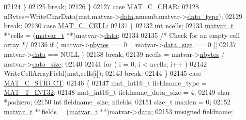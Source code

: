 \begin{DoxyCode}
{{{{{{{{{{{{{{{{02124             \}
02125             \textcolor{keywordflow}{break};
02126         \}
02127         \textcolor{keywordflow}{case} \hyperlink{group___m_a_t_ggad4d60ae7b709fc81bfd744fb4c857c40aacdec5834df0861130b393697646119c}{MAT\_C\_CHAR}:
02128             nBytes=WriteCharData(mat,matvar->\hyperlink{group___m_a_t_a5672978efa230bbdecdf38ede781f7fa}{data},nmemb,matvar->\hyperlink{group___m_a_t_ab6aafe9bd77f0f077852593dec438144}{data\_type});
02129             \textcolor{keywordflow}{break};
02130         \textcolor{keywordflow}{case} \hyperlink{group___m_a_t_ggad4d60ae7b709fc81bfd744fb4c857c40a2f7abb47a1c51e248bd4e5e03cc81b08}{MAT\_C\_CELL}:
02131         \{
02132             \textcolor{keywordtype}{int}        ncells;
02133             \hyperlink{group___m_a_t_structmatvar__t}{matvar\_t} **cells = (\hyperlink{group___m_a_t_structmatvar__t}{matvar\_t} **)matvar->\hyperlink{group___m_a_t_a5672978efa230bbdecdf38ede781f7fa}{data};
02134 
02135             \textcolor{comment}{/* Check for an empty cell array */}
02136             if ( matvar->\hyperlink{group___m_a_t_abf1c844540503be2df9bb3db93cfe307}{nbytes} == 0 || matvar->\hyperlink{group___m_a_t_a9ad1c82e2b568da617e12dc73a26e1f9}{data\_size} == 0 ||
02137                  matvar->\hyperlink{group___m_a_t_a5672978efa230bbdecdf38ede781f7fa}{data}   == NULL )
02138                 \textcolor{keywordflow}{break};
02139             ncells  = matvar->\hyperlink{group___m_a_t_abf1c844540503be2df9bb3db93cfe307}{nbytes} / matvar->\hyperlink{group___m_a_t_a9ad1c82e2b568da617e12dc73a26e1f9}{data\_size};
02140 
02141             \textcolor{keywordflow}{for} ( i = 0; i < ncells; i++ )
02142                 WriteCellArrayField(mat,cells[i]);
02143             \textcolor{keywordflow}{break};
02144         \}
02145         \textcolor{keywordflow}{case} \hyperlink{group___m_a_t_ggad4d60ae7b709fc81bfd744fb4c857c40acb467c7749c80902b798134c729bb521}{MAT\_C\_STRUCT}:
02146         \{
02147             mat\_int16\_t fieldname\_type = \hyperlink{group___m_a_t_ggacf7b3b879282b7ab3a51190e49bf3453a83e06a68320726c6572bfbb9f3addb1d}{MAT\_T\_INT32};
02148             mat\_int16\_t fieldname\_data\_size = 4;
02149             \textcolor{keywordtype}{char} *padzero;
02150             \textcolor{keywordtype}{int} fieldname\_size, nfields;
02151             \textcolor{keywordtype}{size\_t} maxlen = 0;
02152             \hyperlink{group___m_a_t_structmatvar__t}{matvar\_t} **fields = (\hyperlink{group___m_a_t_structmatvar__t}{matvar\_t} **)matvar->\hyperlink{group___m_a_t_a5672978efa230bbdecdf38ede781f7fa}{data};
02153             \textcolor{keywordtype}{unsigned} fieldname;
}}}}}}}}}}}}}}}}
\end{DoxyCode}
